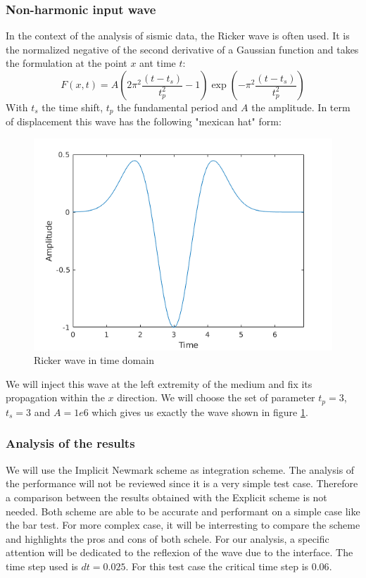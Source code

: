 \subsubsection{Non-harmonic input wave}
In the context of the analysis of sismic data, the Ricker wave is often used. It is the normalized negative of the second derivative of a Gaussian function and takes the formulation at the point $x$ ant time $t$:
\begin{equation}
F(x,t) = A \left(2 \pi^2 \frac{(t-t_s)}{t_p^2} -1\right) \exp\left(-\pi^2 \frac{(t-t_s)}{t_p^2}\right)
\end{equation}   
With $t_s$ the time shift, $t_p$ the fundamental period and $A$ the amplitude.
In term of displacement this wave has the following "mexican hat" form:
\begin{figure}[H]
  \centering
  \includegraphics[scale=0.8]{images/ricker.png}
  \caption{Ricker wave in time domain}
  \label{fig:Ricker}
\end{figure}  
We will inject this wave at the left extremity of the medium and fix its propagation within the $x$ direction. We will choose the set of parameter $t_p = 3$, $t_s = 3$ and $A = 1e6$ which gives us exactly the wave shown in figure \ref{fig:Ricker}.
\subsubsection{Analysis of the results}
We will use the Implicit Newmark scheme as integration scheme. The analysis of the performance will not be reviewed since it is a very simple test case. Therefore a comparison between the results obtained with the Explicit scheme is not needed. Both scheme are able to be accurate and performant on a simple case like the bar test. For more complex case, it will be interresting to compare the scheme and highlights the pros and cons of both schele. For our analysis, a specific attention will be dedicated to the reflexion of the wave due to the interface. The time step used is $dt = 0.025$. For this test case the critical time step is $0.06$.\\ 


